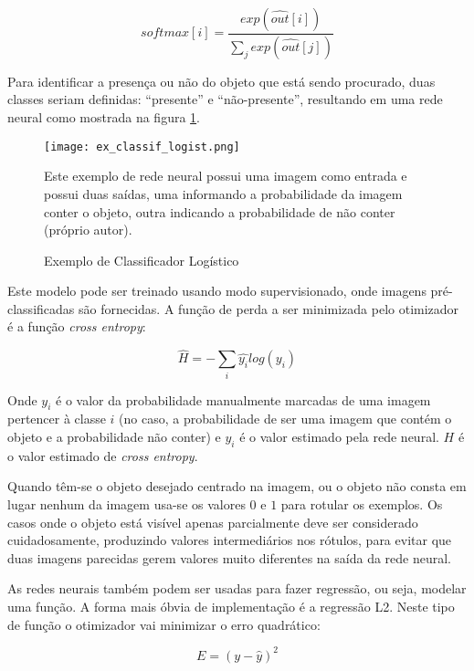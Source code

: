 \begin{equation}
	softmax[i] = \frac
		{exp\left( \widehat{out}[i] \right)}
		{\sum_j exp\left( \widehat{out}[j] \right)}
\end{equation}

Para identificar a presença ou não do objeto que está sendo procurado, duas
classes seriam definidas: ``presente'' e ``não-presente'', resultando em uma rede
neural como mostrada na figura \ref{fig:ex_classif_logist}.

\begin{figure}[!htb]
	\centering
	\texttt{[image: ex\_classif\_logist.png]}
	\caption{Exemplo de Classificador Logístico}
	\label{fig:ex_classif_logist}
	Este exemplo de rede neural possui uma imagem como entrada e possui duas
	saídas, uma informando a probabilidade da imagem conter o objeto, outra
	indicando a probabilidade de não conter (próprio autor).
\end{figure}

Este modelo pode ser treinado usando modo supervisionado, onde imagens
pré-classificadas são fornecidas. A função de perda a ser minimizada pelo
otimizador é a função \emph{cross entropy}:

\begin{equation}
	\widehat{H} = - \sum_i \widehat{y_i} log(y_i)
\end{equation}

Onde $y_i$ é o valor da probabilidade manualmente
marcadas de uma imagem pertencer à classe $i$ (no caso, a probabilidade de ser
uma imagem que contém o objeto e a probabilidade não conter) e $\widehat{y_i}$
é o valor estimado pela rede neural. $H$ é o valor estimado de
\emph{cross entropy}.

Quando têm-se o objeto desejado centrado na imagem, ou o objeto não consta
em lugar nenhum da imagem usa-se os valores $0$ e $1$ para rotular os exemplos.
Os casos onde o objeto está visível apenas parcialmente deve ser considerado
cuidadosamente, produzindo valores intermediários nos rótulos, para evitar que
duas imagens parecidas gerem valores muito diferentes na saída da rede neural.

As redes neurais também podem ser usadas para fazer regressão, ou seja, modelar
uma função. A forma mais óbvia de implementação é a regressão L2. Neste tipo de
função o otimizador vai minimizar o erro quadrático:

\begin{equation}
	E=\left( y - \widehat{y} \right)^2
\end{equation}


